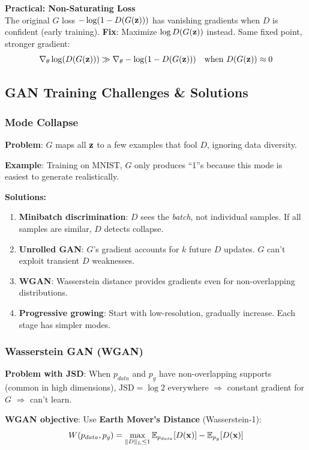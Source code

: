 \textbf{Practical: Non-Saturating Loss}\\
The original $G$ loss $-\log(1-D(G(\mathbf{z})))$ has vanishing gradients when $D$ is confident (early training). \textbf{Fix}: Maximize $\log D(G(\mathbf{z}))$ instead. Same fixed point, stronger gradient:
$$\nabla_\theta \log(D(G(\mathbf{z}))) \gg \nabla_\theta -\log(1-D(G(\mathbf{z}))) \quad \text{when } D(G(\mathbf{z})) \approx 0$$

\subsection{GAN Training Challenges \& Solutions}

\subsubsection{Mode Collapse}
\textbf{Problem}: $G$ maps all $\mathbf{z}$ to a few examples that fool $D$, ignoring data diversity.

\textbf{Example}: Training on MNIST, $G$ only produces ``1''s because this mode is easiest to generate realistically.

\textbf{Solutions:}
\begin{enumerate}
\item \textbf{Minibatch discrimination}: $D$ sees the \emph{batch}, not individual samples. If all samples are similar, $D$ detects collapse.
\item \textbf{Unrolled GAN}: $G$'s gradient accounts for $k$ future $D$ updates. $G$ can't exploit transient $D$ weaknesses.
\item \textbf{WGAN}: Wasserstein distance provides gradients even for non-overlapping distributions.
\item \textbf{Progressive growing}: Start with low-resolution, gradually increase. Each stage has simpler modes.
\end{enumerate}

\subsubsection{Wasserstein GAN (WGAN)}
\textbf{Problem with JSD}: When $p_{data}$ and $p_g$ have non-overlapping supports (common in high dimensions), $\text{JSD} = \log 2$ everywhere $\Rightarrow$ constant gradient for $G$ $\Rightarrow$ can't learn.

\textbf{WGAN objective}: Use \textbf{Earth Mover's Distance} (Wasserstein-1):
\begin{equation}
W(p_{data}, p_g) = \max_{\|D\|_L \leq 1} \mathbb{E}_{p_{data}}[D(\mathbf{x})] - \mathbb{E}_{p_g}[D(\mathbf{x})]
\end{equation}

